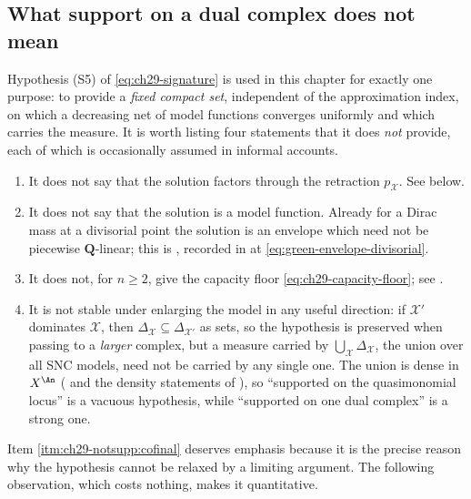 \subsection{What support on a dual complex does not mean}
\label{sec:ch29-support-not}

Hypothesis \textup{(S5)} of \eqref{eq:ch29-signature} is used in this
chapter for exactly one purpose: to provide a \emph{fixed compact set},
independent of the approximation index, on which a decreasing net of model
functions converges uniformly and which carries the measure.  It is worth
listing four statements that it does \emph{not} provide, each of which is
occasionally assumed in informal accounts.

\begin{enumerate}
\item\label{itm:ch29-notsupp:factor}
 It does not say that the solution factors through the retraction
 \(p_{\mathcal X}\).  See  below.
\item\label{itm:ch29-notsupp:model}
 It does not say that the solution is a model function.  Already for a
 Dirac mass at a divisorial point the solution is an envelope which need
 not be piecewise \(\mathbf Q\)-linear; this is
 \cite[Theorem~A]{BJGreen24}, recorded in
  at
 \eqref{eq:green-envelope-divisorial}.
\item\label{itm:ch29-notsupp:floor}
 It does not, for \(n\geq2\), give the capacity floor
 \eqref{eq:ch29-capacity-floor}; see .
\item\label{itm:ch29-notsupp:cofinal}
 It is not stable under enlarging the model in any useful direction: if
 \(\mathcal X'\) dominates \(\mathcal X\), then
 \(\Delta_{\mathcal X}\subseteq\Delta_{\mathcal X'}\) as sets, so the
 hypothesis is preserved when passing to a \emph{larger} complex, but a
 measure carried by \(\bigcup_{\mathcal X}\Delta_{\mathcal X}\), the union
 over all SNC models, need not be carried by any single one.  The union is
 dense in \(X^{\An}\) ( and the density statements of
 ), so ``supported on the quasimonomial locus'' is a
 vacuous hypothesis, while ``supported on one dual complex'' is a strong
 one.
\end{enumerate}

Item \cref{itm:ch29-notsupp:cofinal} deserves emphasis because it is the
precise reason why the hypothesis cannot be relaxed by a limiting argument.
The following observation, which costs nothing, makes it quantitative.

